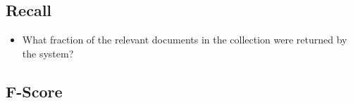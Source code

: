 \subsection{Recall}
\begin{itemize}
    \item What fraction of the relevant documents in the collection were returned by the system? \cite{ir-1}
\end{itemize}

\subsection{F-Score}















